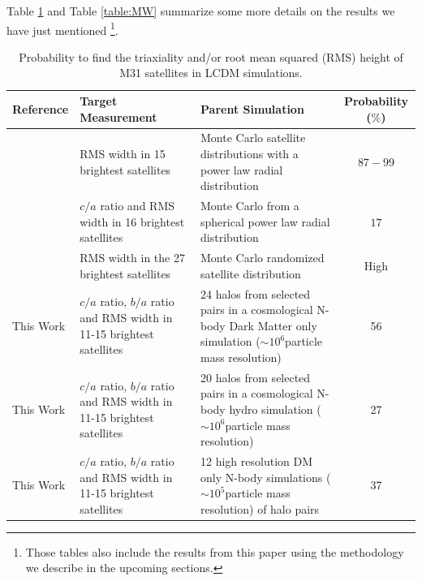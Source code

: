 \documentclass[a4paper,fleqn,usenatbib]{mnras}
\newcommand{\Msun}{{\ifmmode{{\rm{M_{\odot}}}}\else{${\rm{M_{\odot}}}$}\fi}}
\begin{document}
Table \ref{table:M31} and Table \ref{table:MW} summarize some more
details on the results we have just mentioned \footnote{
Those tables also include the results from this paper using the
methodology we describe in the upcoming sections.}.

\begin{table}
\centering
\begin{tabular}{|p{4.0cm}|p{4.5cm}| p{5.5cm}| c|}\hline
Reference & Target Measurement & Parent Simulation & Probability ($\%$)\\\hline
\text{\cite{2006AJ....131.1405K}} & RMS width in 15 brightest
satellites & Monte Carlo satellite distributions with a power law
radial distribution & $87-99$\\
\text{\cite{2007MNRAS.374.1125M}} & $c/a$ ratio and RMS width in 16 brightest satellites & Monte Carlo from a spherical power law radial
distribution & $17$\\
\text{\cite{2013ApJ...766..120C}}& RMS width in the 27 brightest
satellites & Monte Carlo randomized satellite distribution & High\\
This Work & $c/a$ ratio, $b/a$ ratio and RMS width in 11-15 brightest
satellites & 24 halos from selected pairs in a cosmological N-body Dark Matter only simulation ($\sim
10^{6}$\Msun particle mass resolution)& 56 \\
This Work & $c/a$ ratio, $b/a$ ratio and RMS width in 11-15 brightest
satellites & 20 halos from selected pairs in a cosmological N-body hydro simulation ($\sim
10^{6}$\Msun particle mass resolution)& 27 \\
This Work & $c/a$ ratio, $b/a$ ratio and RMS width in 11-15 brightest
satellites & 12 high resolution DM only N-body simulations ($\sim
10^{5}$\Msun particle mass resolution) of halo pairs & 37 \\
\hline
\end{tabular}
\caption{Probability to find  the triaxiality and/or root mean squared
  (RMS) height of M31 satellites in LCDM simulations. 
\label{table:M31}}
\end{table}
\end{document}
